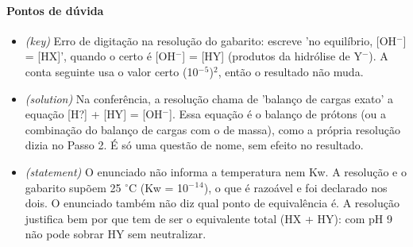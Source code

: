 \documentclass{article}%
\begin{document}
\paragraph{Pontos de dúvida}%
\begin{itemize}%
\item%
\textit{(key)} Erro de digitação na resolução do gabarito: escreve 'no equilíbrio, {[}OH$^{-}${]} = {[}HX{]}', quando o certo é {[}OH$^{-}${]} = {[}HY{]} (produtos da hidrólise de Y$^{-}$). A conta seguinte usa o valor certo (10$^{-}$$^{5}$)$^2$, então o resultado não muda.%
\item%
\textit{(solution)} Na conferência, a resolução chama de 'balanço de cargas exato' a equação {[}H?{]} + {[}HY{]} = {[}OH$^{-}${]}. Essa equação é o balanço de prótons (ou a combinação do balanço de cargas com o de massa), como a própria resolução dizia no Passo 2. É só uma questão de nome, sem efeito no resultado.%
\item%
\textit{(statement)} O enunciado não informa a temperatura nem Kw. A resolução e o gabarito supõem 25 $^\circ$C (Kw = 10$^{-}$$^{1}$$^{4}$), o que é razoável e foi declarado nos dois. O enunciado também não diz qual ponto de equivalência é. A resolução justifica bem por que tem de ser o equivalente total (HX + HY): com pH 9 não pode sobrar HY sem neutralizar.%
\end{itemize}%
\end{document}
